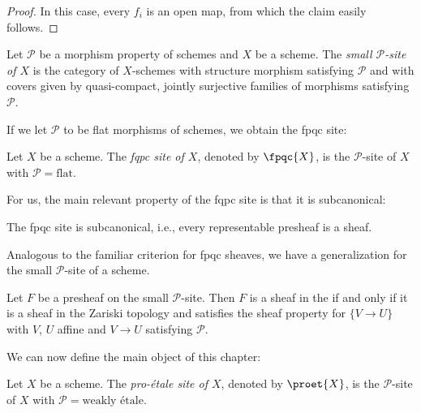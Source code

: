 \begin{proof}
    \leanok
    In this case, every $f_i$ is an open map, from which the claim easily follows.
\end{proof}

\begin{definition}
    Let $\mathcal{P}$ be a morphism property of schemes and $X$ be a scheme.
    The \emph{small $\mathcal{P}$-site of $X$} is the category of $X$-schemes with
    structure morphism satisfying $\mathcal{P}$ and with covers given by quasi-compact,
    jointly surjective families of morphisms satisfying $\mathcal{P}$.
    \label{def:small-P-site}
    \mathlibok
\end{definition}

If we let $\mathcal{P}$ to be flat morphisms of schemes, we obtain the fpqc site:

\begin{definition}
    Let $X$ be a scheme. The \emph{fqpc site of $X$}, denoted by $\fpqc{X}$, is the
    $\mathcal{P}$-site of $X$ with $\mathcal{P} = \text{flat}$.
    \label{def:fpqc-site}
    \mathlibok
\end{definition}

For us, the main relevant property of the fqpc site is that it is subcanonical:

\begin{theorem}
    The fpqc site is subcanonical, i.e., every representable presheaf is a sheaf.
    \label{thm:fpqc-subcanonical}
    \mathlibok
\end{theorem}

Analogous to the familiar criterion for fpqc sheaves, we have a generalization
for the small $\mathcal{P}$-site of a scheme.

\begin{proposition}
    Let $F$ be a presheaf on the small $\mathcal{P}$-site. Then $F$ is a sheaf in the
    if and only if it is a sheaf in the Zariski topology and satisfies
    the sheaf property for $\{V \to U\}$ with $V$, $U$ affine
    and $V \to U$ satisfying $\mathcal{P}$.
    \label{prop:fpqc-sheaf-iff}
    \mathlibok
\end{proposition}

We can now define the main object of this chapter:

\begin{definition}
    Let $X$ be a scheme. The \emph{pro-étale site of $X$}, denoted by $\proet{X}$, is the
    $\mathcal{P}$-site of $X$ with $\mathcal{P} = \text{weakly étale}$.

    \label{def:proetale-site}
    \mathlibok
\end{definition}

